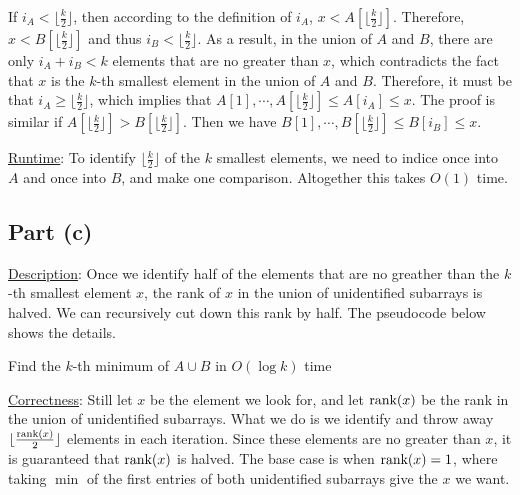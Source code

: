 \documentclass{article}
\begin{document}
If $i_A<\lfloor\frac{k}{2}\rfloor$, then according to the definition of $i_A$, $x<A[\lfloor\frac{k}{2}\rfloor]$. Therefore, $x<B[\lfloor\frac{k}{2}\rfloor]$ and thus $i_B<\lfloor\frac{k}{2}\rfloor$. As a result, in the union of $A$ and $B$, there are only $i_A+i_B<k$ elements that are no greater than $x$, which contradicts the fact that $x$ is the $k$-th smallest element in the union of $A$ and $B$. Therefore, it must be that $i_A\geqslant\lfloor\frac{k}{2}\rfloor$, which implies that $A[1],\cdots,A[\lfloor\frac{k}{2}\rfloor]\leqslant A[i_A]\leqslant x$. The proof is similar if $A[\lfloor\frac{k}{2}\rfloor]>B[\lfloor\frac{k}{2}\rfloor]$. Then we have $B[1],\cdots,B[\lfloor\frac{k}{2}\rfloor]\leqslant B[i_B]\leqslant x$.

\noindent\underline{Runtime}: To identify $\lfloor\frac{k}{2}\rfloor$ of the $k$ smallest elements, we need to indice once into $A$ and once into $B$, and make one comparison. Altogether this takes $O(1)$ time.

\subsection{Part (c)}
\noindent\underline{Description}: Once we identify half of the elements that are no greather than the $k$-th smallest element $x$, the rank of $x$ in the union of unidentified subarrays is halved. We can recursively cut down this rank by half. The pseudocode below shows the details.
\begin{algorithm}
\caption{Find the $k$-th minimum of $A\cup B$ in $O(\log k)$ time}
\begin{algorithmic}[1]
\Else
	\Else{}
	\EndIf
\EndIf
\EndProcedure
\end{algorithmic}
\end{algorithm}

\noindent\underline{Correctness}: Still let $x$ be the element we look for, and let $\textup{rank}(x)$ be the rank in the union of unidentified subarrays. What we do is we identify and throw away $\lfloor\frac{\textup{rank}(x)}{2}\rfloor$ elements in each iteration. Since these elements are no greater than $x$, it is guaranteed that $\textup{rank}(x)$ is halved. The base case is when $\textup{rank}(x)=1$, where taking $\min$ of the first entries of both unidentified subarrays give the $x$ we want.
\end{document}
